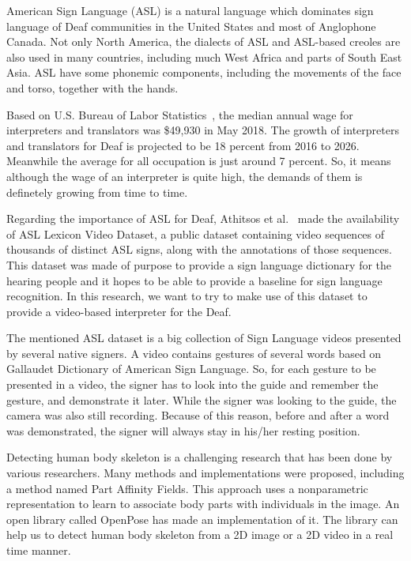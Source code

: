 American Sign Language (ASL) is a natural language which dominates sign language of Deaf communities in the United States and most of Anglophone Canada. Not only North America, the dialects of ASL and ASL-based creoles are also used in many countries, including much West Africa and parts of South East Asia. ASL have some phonemic components, including the movements of the face and torso, together with the hands.

Based on U.S. Bureau of Labor Statistics~\cite{bureauOfLaborStat}, the median annual wage for interpreters and translators was \$49,930 in May 2018. The growth of interpreters and translators for Deaf is projected to be 18 percent from 2016 to 2026. Meanwhile the average for all occupation is just around 7 percent. So, it means although the wage of an interpreter is quite high, the demands of them is definetely growing from time to time.

Regarding the importance of ASL for Deaf, Athitsos et al.~\cite{ASLLexiconVideoDataset} made the availability of ASL Lexicon Video Dataset, a public dataset containing video sequences of thousands of distinct ASL signs, along with the annotations of those sequences. This dataset was made of purpose to provide a sign language dictionary for the hearing people and it hopes to be able to provide a baseline for sign language recognition. In this research, we want to try to make use of this dataset to provide a video-based interpreter for the Deaf.

The mentioned ASL dataset is a big collection of Sign Language videos presented by several native signers. A video contains gestures of several words based on Gallaudet Dictionary of American Sign Language. So, for each gesture to be presented in a video, the signer has to look into the guide and remember the gesture, and demonstrate it later. While the signer was looking to the guide, the camera was also still recording. Because of this reason, before and after a word was demonstrated, the signer will always stay in his/her resting position.

Detecting human body skeleton is a challenging research that has been done by various researchers. Many methods and implementations were proposed, including a method named Part Affinity Fields. This approach uses a nonparametric representation to learn to associate body parts with individuals in the image. An open library called OpenPose has made an implementation of it. The library can help us to detect human body skeleton from a 2D image or a 2D video in a real time manner.

